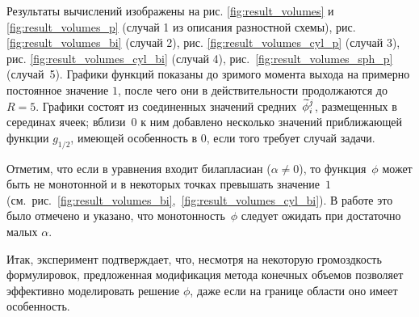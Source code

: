 Результаты вычислений изображены на рис. \ref{fig:result_volumes} и \ref{fig:result_volumes_p} (случай 1 из описания разностной схемы), рис. \ref{fig:result_volumes_bi} (случай 2), рис. \ref{fig:result_volumes_cyl_p} (случай 3), рис. \ref{fig:result_volumes_cyl_bi} (случай 4), рис.~\ref{fig:result_volumes_sph_p} (случай~5). Графики функций показаны до зримого момента выхода на примерно постоянное значение $1$, после чего они в действительности продолжаются до $R = 5$. Графики состоят из соединенных значений средних~${\widetilde{\phi}}_i^j$, размещенных в серединах ячеек; вблизи~$0$ к ним добавлено несколько значений приближающей функции $g_{1/2}$, имеющей особенность в $0$, если того требует случай задачи.

Отметим, что если в уравнения входит билапласиан ($\alpha \neq 0$), то функция~$\phi$ может быть не монотонной и в некоторых точках превышать значение~$1$ (см.~рис.~\ref{fig:result_volumes_bi},~\ref{fig:result_volumes_cyl_bi}). В работе \cite{zipunova_higher_codimension} это было отмечено и указано, что монотонность~$\phi$ следует ожидать при достаточно малых $\alpha$.

Итак, эксперимент подтверждает, что, несмотря на некоторую громоздкость формулировок, предложенная модификация метода конечных объемов позволяет эффективно моделировать решение $\phi$, даже если на границе области оно имеет особенность.